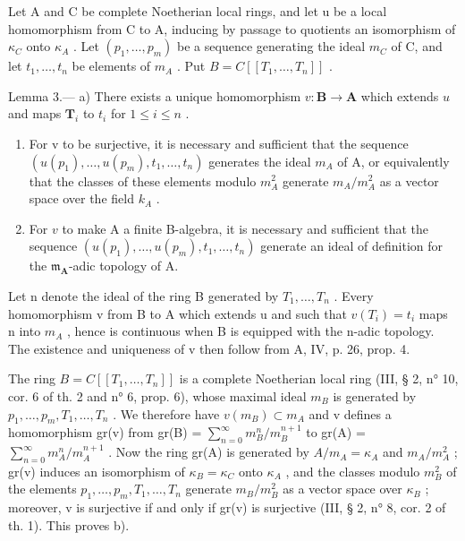 Let A and C be complete Noetherian local rings, and let u be a local homomorphism from C to A, inducing by passage to quotients an isomorphism of \(\kappa_{C}\) onto \(\kappa_{A}\) . Let \((p_{1}, \ldots, p_{m})\) be a sequence generating the ideal \(m_{C}\) of C, and let \(t_{1}, \ldots, t_{n}\) be elements of \(m_{A}\) . Put \(B = C[[T_{1}, \ldots, T_{n}]]\) .

Lemma 3.--- a) There exists a unique homomorphism \(v: \mathbf{B} \to \mathbf{A}\) which extends \(u\) and maps \(\mathbf{T}_i\) to \(t_i\) for \(1 \leqslant i \leqslant n\) .

\begin{enumerate}
\def\labelenumi{\alph{enumi})}
\setcounter{enumi}{1}
\item
  For v to be surjective, it is necessary and sufficient that the sequence \((u(p_{1}), \ldots, u(p_{m}), t_{1}, \ldots, t_{n})\) generates the ideal \(m_{A}\) of A, or equivalently that the classes of these elements modulo \(m_{A}^{2}\) generate \(m_{A}/m_{A}^{2}\) as a vector space over the field \(k_{A}\) .
\item
  For \(v\) to make A a finite B-algebra, it is necessary and sufficient that the sequence \((u(p_1), \ldots, u(p_m), t_1, \ldots, t_n)\) generate an ideal of definition for the \(\mathfrak{m}_{\mathbf{A}}\)-adic topology of A.
\end{enumerate}

Let n denote the ideal of the ring B generated by \(T_{1}, \ldots, T_{n}\) . Every homomorphism v from B to A which extends u and such that \(v(T_{i}) = t_{i}\) maps n into \(m_{A}\) , hence is continuous when B is equipped with the n-adic topology. The existence and uniqueness of v then follow from A, IV, p. 26, prop. 4.

The ring \(B = C[[T_{1}, \ldots, T_{n}]]\) is a complete Noetherian local ring (III, § 2, n° 10, cor. 6 of th. 2 and n° 6, prop. 6), whose maximal ideal \(m_{B}\) is generated by \(p_{1}, \ldots, p_{m}, T_{1}, \ldots, T_{n}\) . We therefore have \(v(m_{B}) \subset m_{A}\) and v defines a homomorphism gr(v) from gr(B) = \(\sum_{n=0}^{\infty} m_{B}^{n}/m_{B}^{n+1}\) to gr(A) = \(\sum_{n=0}^{\infty} m_{A}^{n}/m_{A}^{n+1}\) . Now the ring gr(A) is generated by \(A/m_{A} = \kappa_{A}\) and \(m_{A}/m_{A}^{2}\) ; gr(v) induces an isomorphism of \(\kappa_{B} = \kappa_{C}\) onto \(\kappa_{A}\) , and the classes modulo \(m_{B}^{2}\) of the elements \(p_{1}, \ldots, p_{m}, T_{1}, \ldots, T_{n}\) generate \(m_{B}/m_{B}^{2}\) as a vector space over \(\kappa_{B}\) ; moreover, v is surjective if and only if gr(v) is surjective (III, § 2, n° 8, cor. 2 of th. 1). This proves b).

